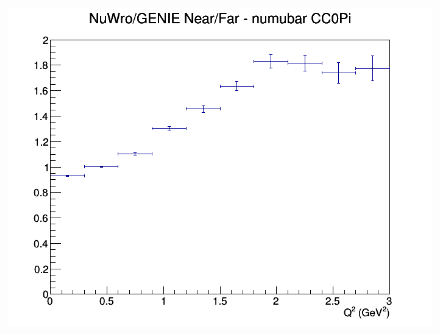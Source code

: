 \begin{figure}[h]
\endminipage
{}
\includegraphics[width=\linewidth]{Q2/nominal/ratios/CC0Pi_NuWro_GENIE_numubar_NF_Q2.png}
\endminipage
\newline
\end{figure}
\clearpage
